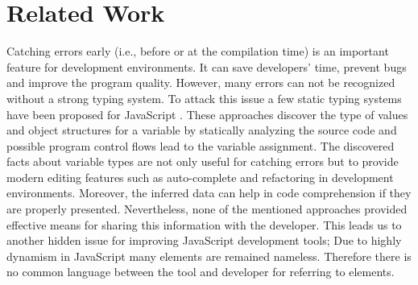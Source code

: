 \documentclass[10pt, preprint]{sigplanconf}
\begin{document}

\section{Related Work}



Catching errors early (i.e., before or at the compilation time) is an important feature for development environments. It can save developers' time, prevent bugs and improve the program quality. However, many errors can not be recognized without a strong typing system. To attack this issue a few static typing systems have been proposed for JavaScript \cite{Anderson, Anderson2, Heidegger, Thiemann}. These approaches discover the type of values and object structures for a variable by statically analyzing the source code and possible program control flows lead to the variable assignment. The discovered facts about variable types are not only useful for catching errors but to provide modern editing features such as auto-complete and refactoring in development environments. Moreover, the inferred data can help in code comprehension if they are properly presented. Nevertheless, none of the mentioned approaches provided effective means for sharing this information with the developer. This leads us to another hidden issue for improving JavaScript development tools; Due to highly dynamism in JavaScript many elements are remained nameless. Therefore there is no common language between the tool and developer for referring to elements.
\end{document}

